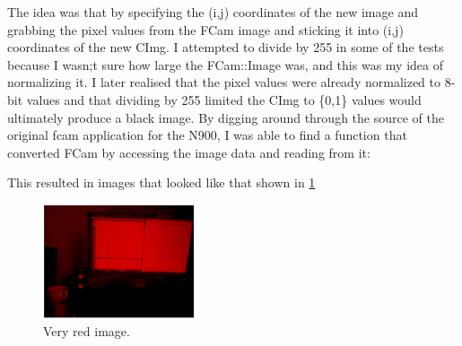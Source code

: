 \documentclass[11pt]{article} %
\begin{document}
The idea was that by specifying the (i,j) coordinates of the new image and grabbing the pixel values from the FCam image and sticking it into (i,j) coordinates of the new CImg. I attempted to divide by 255 in some of the tests because I wasn;t sure how large the FCam::Image was, and this was my idea of normalizing it. I later realised that the pixel values were already normalized to 8-bit values and that dividing by 255 limited the CImg to \{0,1\} values would ultimately produce a black image.
By digging around through the source of the original fcam application for the N900, I was able to find a function that converted FCam by accessing the image data and reading from it:
\begin{frame}{}

\end{frame}
This resulted in images that looked like that shown in \cref{img:red}
\begin{figure}
        	\vspace{0pt}\hspace{-200pt}
	\centering
		\includegraphics[width=0.4\textwidth]{../images/redbuffer1}\hspace{-200pt}
	\caption{Very red image.}\hspace{-200pt}
	\label{img:red}\hspace{-200pt}
\end{figure}
\end{document}
